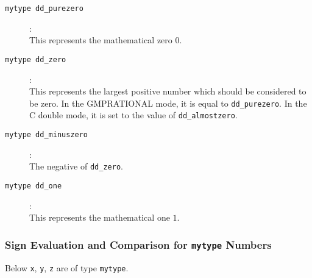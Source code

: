 \documentclass[11pt]{article}
\newcommand {\0} {{\bf 0}}
\begin{document}
\begin{description}

\item[{\tt mytype dd\_purezero}]:\\
This represents the mathematical zero $0$.

\item[{\tt mytype dd\_zero}]:\\
This represents the largest positive number which should be considered to be zero.  In the GMPRATIONAL
mode, it is equal to {\tt dd\_purezero}.   In the C double mode, it is set to the value of {\tt dd\_almostzero}.

\item[{\tt mytype dd\_minuszero}]:\\
The negative of {\tt dd\_zero}.

\item[{\tt mytype dd\_one}]:\\
This represents the mathematical one $1$.


\end{description}

\subsubsection{Sign Evaluation and Comparison for {\tt mytype} Numbers}

Below {\tt x}, {\tt y}, {\tt z} are of type {\tt mytype}.  
\end{document}
